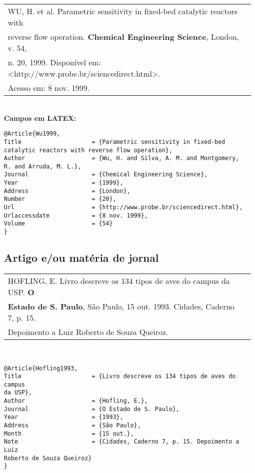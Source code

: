 \begin{tabular}{|l|c|} \hline
	WU, H. et al. Parametric sensitivity in fixed-bed catalytic reactors with     \\
	reverse flow operation. \textbf{Chemical Engineering Science}, London, v. 54, \\
	n. 20, 1999. Disponível em: <http://www.probe.br/sciencedirect.html>.        \\Acesso em: 8 nov. 1999. \\\hline
\end{tabular} \\
	
\textbf{Campos em LATEX:} 
	
\begingroup
\fontsize{10pt}{12pt}\selectfont
\begin{verbatim}
@Article{Wu1999,
Title                    = {Parametric sensitivity in fixed-bed 
catalytic reactors with reverse flow operation},
Author                   = {Wu, H. and Silva, A. M. and Montgomery, 
R. and Arruda, M. L.},
Journal                  = {Chemical Engineering Science},
Year                     = {1999},
Address                  = {London},
Number                   = {20},
Url                      = {http://www.probe.br/sciencedirect.html},
Urlaccessdate            = {8 nov. 1999},
Volume                   = {54}
}
\end{verbatim}
\endgroup
\subsection{Artigo e/ou matéria de jornal}
	
\begin{tabular}{|l|c|} \hline
	HOFLING, E. Livro descreve os 134 tipos de aves do campus da USP. \textbf{O} \\ \textbf{Estado de S. Paulo}, São Paulo, 15 out. 1993. Cidades, Caderno 7, p. 15. \\Depoimento a Luiz Roberto de Souza Queiroz.	\\\hline
\end{tabular} \\
	
\begingroup
\fontsize{10pt}{12pt}\selectfont
\begin{verbatim}
@Article{Hofling1993,
Title                    = {Livro descreve os 134 tipos de aves do campus
da USP},
Author                   = {Hofling, E.},
Journal                  = {O Estado de S. Paulo},
Year                     = {1993},
Address                  = {São Paulo},
Month                    = {15 out.},
Note                     = {Cidades, Caderno 7, p. 15. Depoimento a Luiz 
Roberto de Souza Queiroz}
}
\end{verbatim}
\endgroup
	
